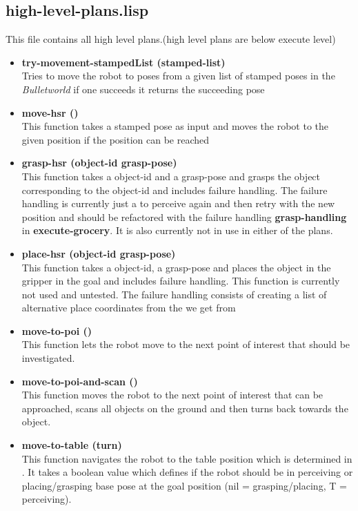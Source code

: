 \documentclass[main.tex]{subfiles}
\begin{document}
	    \subsection{high-level-plans.lisp}
	    \label{high-level}
	    This file contains all high level plans.(high level plans are below execute level)
	    \begin{itemize}
		\item \textbf{try-movement-stampedList (stamped-list)} \\
		Tries to move the robot to poses from a given list of stamped poses in the \textit{Bulletworld} if one succeeds it returns the succeeding pose 
	    \item \textbf{move-hsr ()} \\
	    This function takes a stamped pose as input and moves the robot to the given position if the position can be reached
	    \item \textbf{grasp-hsr (object-id grasp-pose)} \\
	    This function takes a object-id and a grasp-pose and grasps the object corresponding to the object-id and includes failure handling. The failure handling is currently just a to perceive again and then retry with the new position and should be refactored with the failure handling \textbf{grasp-handling} in \textbf{execute-grocery}.
	    It is also currently not in use in either of the plans.
	    \item \textbf{place-hsr (object-id grasp-pose)} \\
	    This function takes a object-id, a grasp-pose and places the object in the gripper in the goal and includes failure handling. This function is currently not used and untested. The failure handling consists of creating a list of alternative place coordinates from the we get from 
	    \item \textbf{move-to-poi ()} \\
	    This function lets the robot move to the next point of interest that should be investigated. 
	    \item \textbf{move-to-poi-and-scan ()} \\
	    This function moves the robot to the next point of interest that can be approached, scans all objects on the ground and then turns back towards the object.
	    \item \textbf{move-to-table (turn)} \\
	    This function navigates the robot to the table position which is determined in . It takes a boolean value which defines if the robot should be in perceiving or placing/grasping base pose at the goal position (nil = grasping/placing, T = perceiving). 

\end{itemize}
\end{document}
